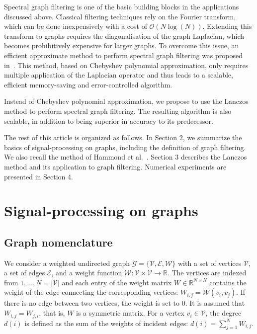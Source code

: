 \documentclass{article}
\newcommand{\G}{\mathcal{G}}
\newcommand{\E}{\mathcal{E}}
\newcommand{\V}{\mathcal{V}}
\newcommand{\Om}{\mathcal{O}}
\newcommand{\Rbb}{\mathbb{R}} \newcommand{\Cbb}{\mathbb{C}}
\begin{document}
Spectral graph filtering is one of the basic building blocks in the applications discussed above. 
Classical filtering techniques rely on the Fourier transform, which can be done inexpensively with a cost of $\Om(N\log(N))$.  Extending this transform to graphs requires the diagonalisation of the graph Laplacian, which becomes
prohibitively expensive for larger graphs. To overcome this issue, an efficient approximate method to perform spectral graph filtering was proposed in~\cite{hammond2011wavelets}. This method, based on Chebyshev polynomial approximation, only requires multiple application of the Laplacian operator and thus leads to a scalable, efficient memory-saving and error-controlled algorithm.

Instead of Chebyshev polynomial approximation, we propose to use the Lanczos method to perform spectral graph filtering. The resulting algorithm is also scalable, in addition to being superior in accuracy to its predecessor.

The rest of this article is organized as follows. In Section 2, we summarize the basics of signal-processing on graphs, including the definition of graph filtering. We also recall the method of Hammond et al.~\cite{hammond2011wavelets}. Section 3 describes the Lanczos method and its application to graph filtering. Numerical experiments are presented in Section 4.

\section{Signal-processing on graphs}

\subsection{Graph nomenclature}

We consider a weighted undirected graph $\G=\{ \V,\E,\mathcal{W}\}$ with a set of vertices $\V$, a set of edges $\E$,
and a weight function $\mathcal{W} : \V \times \V \rightarrow \Rbb$. The vertices are indexed from $1,\dots, N=|\V|$ and each entry  of the weight matrix $W \in \mathbb R^{N\times N}$ contains the weight of the edge connecting the corresponding vertices: $W_{i,j} = \mathcal{W}(v_i,v_j)$. If there is no edge between two vertices, the weight is set to $0$. It is assumed that $W_{i,j} = W_{j,i}$, that is, $W$ is a symmetric matrix. For a vertex $v_i\in \V$, the degree $d(i)$ is defined as the sum of the weights of incident edges: $d(i)=\sum_{j=1}^N W_{i,j}$. 
\end{document}
